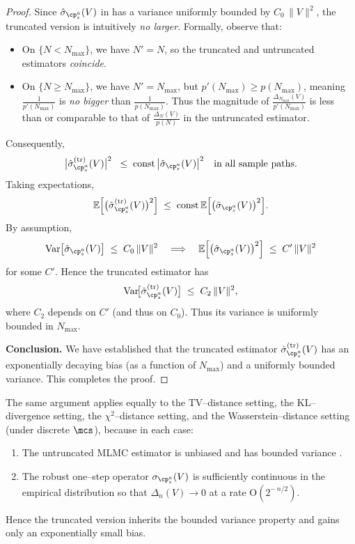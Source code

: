 \begin{proof}
Since $\hat{\sigma}_{\cp^a_s}(V)$ in \citep{wang2023model} has a variance uniformly bounded by $C_0\,\|V\|^2$, the truncated version is intuitively \emph{no larger}.  Formally, observe that:
\begin{itemize}
\item On $\{N<N_{\max}\}$, we have $N'=N$, so the truncated and untruncated estimators \emph{coincide}.
\item On $\{N\ge N_{\max}\}$, we have $N'=N_{\max}$, but $p'(N_{\max}) \ge p(N_{\max})$, meaning $\frac{1}{p'(N_{\max})}$ is \emph{no bigger} than $\frac{1}{p(N_{\max})}$.  Thus the magnitude of $\frac{\Delta_{N_{\max}}(V)}{p'(N_{\max})}$ is less than or comparable to that of $\frac{\Delta_{N}(V)}{p(N)}$ in the untruncated estimator.
\end{itemize}
Consequently,
\[
  \bigl\lvert
    \hat{\sigma}_{\cp^a_s}^{(\mathrm{tr})}(V)
  \bigr\rvert^2
  \;\;\le\;
  \mathrm{const}\,\bigl\lvert
     \hat{\sigma}_{\cp^a_s}(V)
  \bigr\rvert^2
  \quad
  \text{in all sample paths.}
\]
Taking expectations,
\[
  \mathbb{E}\Bigl[
     \bigl(\hat{\sigma}_{\cp^a_s}^{(\mathrm{tr})}(V)\bigr)^2
  \Bigr]
  \;\le\;
  \mathrm{const}\,\mathbb{E}\Bigl[
     \bigl(\hat{\sigma}_{\cp^a_s}(V)\bigr)^2
  \Bigr].
\]
By assumption,
\[
  \mathrm{Var}\bigl[\hat{\sigma}_{\cp^a_s}(V)\bigr]
  \;\le\;
  C_0\,\|V\|^2
  \quad\Longrightarrow\quad
  \mathbb{E}\Bigl[\bigl(\hat{\sigma}_{\cp^a_s}(V)\bigr)^2\Bigr]
  \;\le\;
  C'\,\|V\|^2
\]
for some $C'$.  Hence the truncated estimator has
\begin{equation}
  \mathrm{Var}\!\bigl[\hat{\sigma}_{\cp^a_s}^{(\mathrm{tr})}(V)\bigr]
  \;\le\;
  C_2\,\|V\|^2,
\end{equation}
where $C_2$ depends on $C'$ (and thus on $C_0$).  Thus its variance is uniformly bounded in $N_{\max}$.

\medskip
\textbf{Conclusion.}  
We have established that the truncated estimator $\hat{\sigma}_{\cp^a_s}^{(\mathrm{tr})}(V)$ has an exponentially decaying bias (as a function of $N_{\max}$) and a uniformly bounded variance.  This completes the proof.
\end{proof}

\begin{remark}
The same argument applies equally to the TV--distance setting, the KL--divergence setting, the $\chi^2$--distance setting, and the Wasserstein--distance setting (under discrete $\mcs$), because in each case:
\begin{enumerate}
\item The untruncated MLMC estimator is unbiased and has bounded variance \citep{wang2023model}.
\item The robust one--step operator $\sigma_{\cp^a_s}(V)$ is sufficiently continuous in the empirical distribution so that $\Delta_n(V)\to 0$ at a rate $\mathrm{O}(2^{-\,n/2})$.
\end{enumerate}
Hence the truncated version inherits the bounded variance property and gains only an exponentially small bias.
\end{remark}

